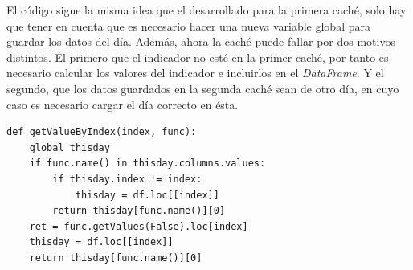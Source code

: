 El c\'odigo sigue la misma idea que el desarrollado para la primera cach\'e, solo hay que tener en cuenta que es necesario hacer una nueva variable global para guardar los datos del d\'ia. Adem\'as, ahora la cach\'e puede fallar por dos motivos distintos. El primero que el indicador no est\'e en la primer cach\'e, por tanto es necesario calcular los valores del indicador e incluirlos en el \textit{DataFrame}. Y el segundo, que los datos guardados en la segunda cach\'e sean de otro d\'ia, en cuyo caso es necesario cargar el d\'ia correcto en \'esta.\\

\begin{lstlisting}
def getValueByIndex(index, func):
	global thisday
	if func.name() in thisday.columns.values:
		if thisday.index != index:
			thisday = df.loc[[index]]
		return thisday[func.name()][0]
	ret = func.getValues(False).loc[index]
	thisday = df.loc[[index]]
	return thisday[func.name()][0]
\end{lstlisting}
